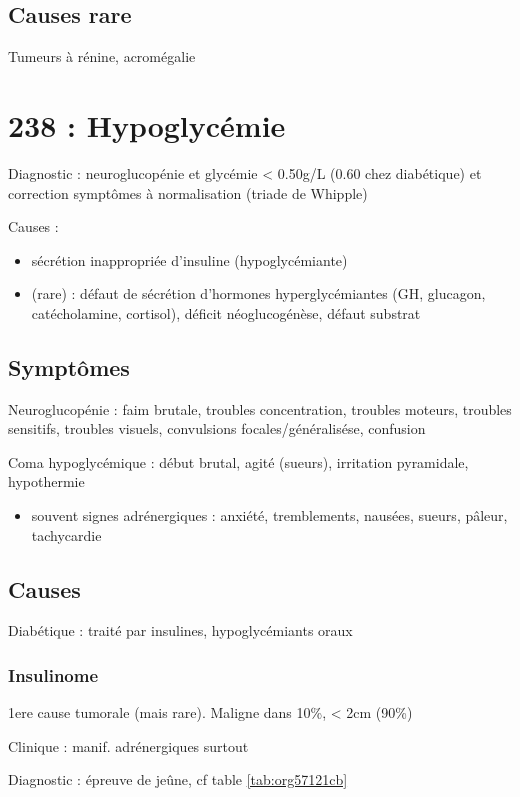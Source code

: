 \documentclass[11pt]{article}
\begin{document}
\subsection{Causes rare}
\label{sec:org099601a}
Tumeurs à rénine, acromégalie
\section{238 : Hypoglycémie}
\label{sec:orga434e65}
Diagnostic : neuroglucopénie et glycémie < 0.50g/L (0.60 chez diabétique) et correction symptômes
à normalisation (triade de Whipple)

Causes :
\begin{itemize}
\item sécrétion inappropriée d'insuline (hypoglycémiante)
\item (rare) : défaut de sécrétion d'hormones hyperglycémiantes (GH, glucagon,
catécholamine, cortisol), déficit néoglucogénèse, défaut substrat
\end{itemize}

\subsection{Symptômes}
\label{sec:org6ac741e}
Neuroglucopénie : faim brutale, troubles concentration, troubles moteurs,
troubles sensitifs, troubles visuels, convulsions focales/généralisése,
confusion

Coma hypoglycémique : début brutal, agité (sueurs), irritation pyramidale, hypothermie

\begin{itemize}
\item souvent signes adrénergiques : anxiété, tremblements, nausées, sueurs,
pâleur, tachycardie
\end{itemize}

\subsection{Causes}
\label{sec:org051cff4}
Diabétique : traité par insulines, hypoglycémiants oraux

\subsubsection{Insulinome}
\label{sec:orgb53ab08}
1ere cause tumorale (mais rare). Maligne dans 10\%, < 2cm (90\%)

Clinique : manif. adrénergiques surtout

Diagnostic : épreuve de jeûne, cf table \ref{tab:org57121cb}
\end{document}
